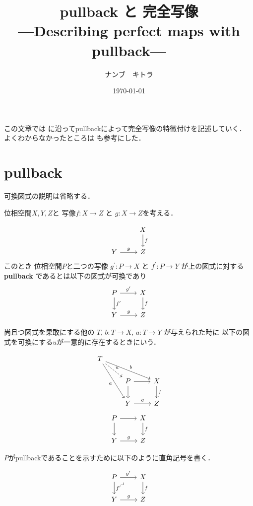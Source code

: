 \documentclass[leqno, a4paper, 12pt, dvipdfmx]{jsarticle}
\title{pullback と 完全写像\\ \large ---Describing perfect maps with pullback---}
\author{ナンブ　キトラ}
\date{\today}
\begin{document}
\maketitle

この文章では
\cite{com}
に沿ってpullbackによって完全写像の特徴付けを記述していく．
よくわからなかったところは
\cite{sta}も参考にした．

\section{pullback}

可換図式の説明は省略する．


位相空間$X, Y, Z$と
写像$f\colon X\to Z$
と
$g\colon X\to Z$を考える．

\[
\begin{tikzcd}
 & X \arrow[d,"f"] \\
Y \arrow[r,"g"] & Z
\end{tikzcd}
\]
このとき
位相空間$P$と二つの写像
$g^{\prime}\colon P\to X$
と
$f^{\prime}\colon P\to Y$
が上の図式に対する
\textbf{pullback}
であるとは以下の図式が可換であり
\[
\begin{tikzcd}
P \arrow[r, "g^{\prime}"] \arrow[d, "f^{\prime}"] 
& X \arrow[d,"f"] \\
Y \arrow[r,"g"] & Z
\end{tikzcd}
\]

尚且つ図式を果敢にする他の
$T$, 
$b\colon T\to X$, 
$a\colon T\to  Y$
が与えられた時に
以下の図式を可換にする$u$が一意的に存在するときにいう．


\[
\begin{tikzcd}
T \arrow[ddr, "a"'] \arrow[drr, "b"] \arrow[dr, dashed, "u"] & & \\
& P \arrow[r] \arrow[d] & X \arrow[d,"f"] \\
& Y \arrow[r,"g"] & Z
\end{tikzcd}
\]
\[
\begin{tikzcd}
P \arrow[r] \arrow[d] & X \arrow[d,"f"] \\
Y \arrow[r,"g"] & Z
\end{tikzcd}
\]


$P$がpullbackであることを示すために以下のように直角記号を書く．

\[
\begin{tikzcd}
P \arrow[r, "g^{\prime}"] \arrow[d, "f^{\prime}"] \arrow[dr, phantom, "\lrcorner", very near start]
& X \arrow[d,"f"] \\
Y \arrow[r,"g"] & Z
\end{tikzcd}
\]
\end{document}
